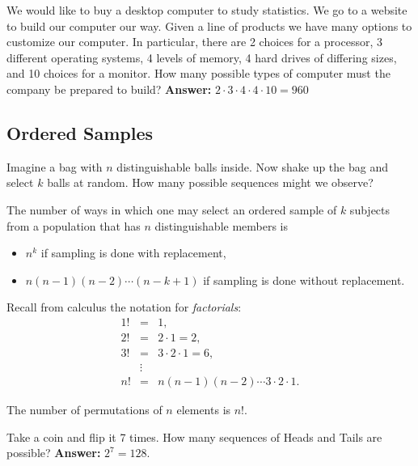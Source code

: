 \documentclass[captions=tableheading]{scrbook}
\begin{document}
\begin{example}
We would like to buy a desktop computer to study statistics. We go to a website to build our computer our way. Given a line of products we have many options to customize our computer. In particular, there are 2 choices for a processor, 3 different operating systems, 4 levels of memory, 4 hard drives of differing sizes, and 10 choices for a monitor. How many possible types of computer must the company be prepared to build? \textbf{Answer:} \(2\cdot3\cdot4\cdot4\cdot10=960\)
\end{example}
\subsection{Ordered Samples}
\label{sec-4-5-1}


Imagine a bag with \(n\) distinguishable balls inside. Now shake up the bag and select \(k\) balls at random. How many possible sequences might we observe?

\begin{prop}
The number of ways in which one may select an ordered sample of \(k\) subjects from a population that has \(n\) distinguishable members is
\begin{itemize}
\item \(n^{k}\) if sampling is done with replacement,
\item \(n(n-1)(n-2)\cdots(n-k+1)\) if sampling is done without replacement.
\end{itemize}

\end{prop}

Recall from calculus the notation for \emph{factorials}: 
\begin{eqnarray*}
1! & = & 1,\\
2! & = & 2\cdot1=2,\\
3! & = & 3\cdot2\cdot1=6,\\
 & \vdots\\
n! & = & n(n-1)(n-2)\cdots3\cdot2\cdot1.
\end{eqnarray*}

\begin{fact}
The number of permutations of \(n\) elements is \(n!\).
\end{fact}

\begin{example}
Take a coin and flip it 7 times. How many sequences of Heads and Tails are possible? \textbf{Answer:} \(2^{7}=128\).
\end{example}
\end{document}
